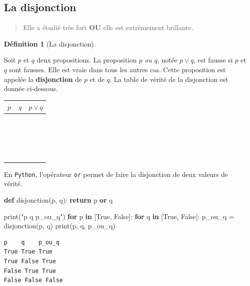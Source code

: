 \documentclass[
  letterpaper,
]{scrbook}
\newenvironment{Shaded}{}{}
\newcommand{\BuiltInTok}[1]{#1}
\newcommand{\ControlFlowTok}[1]{\textcolor[rgb]{0.00,0.44,0.13}{\textbf{#1}}}
\newcommand{\KeywordTok}[1]{\textcolor[rgb]{0.00,0.44,0.13}{\textbf{#1}}}
\newcommand{\NormalTok}[1]{#1}
\newcommand{\OperatorTok}[1]{\textcolor[rgb]{0.40,0.40,0.40}{#1}}
\newcommand{\StringTok}[1]{\textcolor[rgb]{0.25,0.44,0.63}{#1}}
\newcommand{\VariableTok}[1]{\textcolor[rgb]{0.10,0.09,0.49}{#1}}
\theoremstyle{plain}
\theoremstyle{definition}
\theoremstyle{definition}
\newtheorem{definition}{Définition}[chapter]
\theoremstyle{remark}
\begin{document}
\hypertarget{la-disjonction}{%
\subsection{La disjonction}\label{la-disjonction}}

\begin{quote}
Elle a étudié très fort \textbf{OU} elle est extrêmement brillante.
\end{quote}

\leavevmode{}%
\begin{definition}[La disjonction]\label{def-disjonction}

Soit \(p\) et \(q\) deux propositions. La proposition \emph{\(p\) ou
\(q\)}, notée \(p\vee q\), est fausse si \(p\) et \(q\) sont fausses.
Elle est vraie dans tous les autres cas. Cette proposition est appelée
la \textbf{disjonction} de \(p\) et de \(q\). La table de vérité de la
disjonction est donnée ci-dessous.

\begin{longtable}[]{@{}ccc@{}}
\toprule()
\(p\) & \(q\) & \(p \vee q\) \\
\midrule()
\endhead
\(\phantom{V}\) & \(\phantom{V}\) & \(\phantom{V}\) \\
\(\phantom{V}\) & \(\phantom{V}\) & \(\phantom{V}\) \\
\(\phantom{V}\) & \(\phantom{V}\) & \(\phantom{V}\) \\
\(\phantom{V}\) & \(\phantom{V}\) & \(\phantom{V}\) \\
\bottomrule()
\end{longtable}

En \texttt{Python}, l'opérateur \texttt{or} permet de faire la
disjonction de deux valeurs de vérité.

\hypertarget{disjonction-python}{}
\begin{Shaded}
\begin{Highlighting}[]
\KeywordTok{def}\NormalTok{ disjonction(p, q):}
    \ControlFlowTok{return}\NormalTok{ p }\KeywordTok{or}\NormalTok{ q}

\BuiltInTok{print}\NormalTok{(}\StringTok{"p    q    p\_ou\_q"}\NormalTok{)}
\ControlFlowTok{for}\NormalTok{ p }\KeywordTok{in}\NormalTok{ [}\VariableTok{True}\NormalTok{, }\VariableTok{False}\NormalTok{]:}
    \ControlFlowTok{for}\NormalTok{ q }\KeywordTok{in}\NormalTok{ [}\VariableTok{True}\NormalTok{, }\VariableTok{False}\NormalTok{]:}
\NormalTok{        p\_ou\_q }\OperatorTok{=}\NormalTok{ disjonction(p, q)}
        \BuiltInTok{print}\NormalTok{(p, q, p\_ou\_q)}
\end{Highlighting}
\end{Shaded}

\begin{verbatim}
p    q    p_ou_q
True True True
True False True
False True True
False False False
\end{verbatim}

\end{definition}
\end{document}

